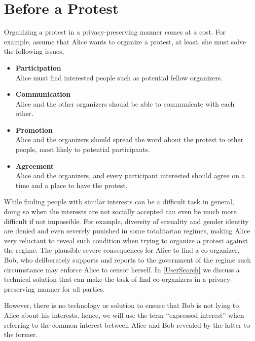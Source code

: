 \section{Before a Protest}
\label{BeforeProtest}
Organizing a protest in a privacy-preserving manner comes at a cost. For example, 
assume that Alice wants to organize a protest, at least, she must solve the following 
issues,
\begin{itemize}
    \item \textbf{Participation}\\
    Alice must find interested people such as potential fellow organizers.
    
    \item \textbf{Communication}\\
    Alice and the other organizers should be able to communicate with each other.
    
    \item \textbf{Promotion}\\
    Alice and the organizers should spread the word about the protest to other people, 
    most likely to potential participants.
    
    \item \textbf{Agreement}\\
    Alice and the organizers, and every participant interested should agree on a 
    time and a place to have the protest.
\end{itemize}

While finding people with similar interests can be a difficult task in general, 
doing so when the interests are not socially accepted can even be much more difficult 
if not impossible. For example, diversity of sexuality and gender identity are denied 
and even severely punished in some totalitarian regimes, making Alice very reluctant 
to reveal such condition when trying to organize a protest against the regime. The 
plausible severe consequences for Alice to find a co-organizer, Bob, who deliberately 
supports and reports to the government of the regime such circumstance may enforce 
Alice to censor herself. In \cref{UserSearch} we discuss a technical solution that 
can make the task of find co-organizers in a privacy-preserving manner for all parties.

However, there is no technology or solution to ensure that Bob is not lying to Alice 
about his interests, hence, we will use the term \enquote{expressed interest} when 
referring to the common interest between Alice and Bob revealed by the latter to 
the former. 

